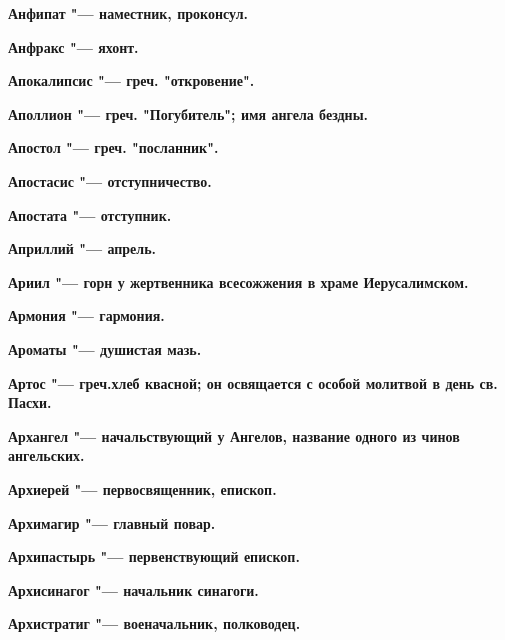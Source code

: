 \bfseries Анфипат \normalfont{} "--- наместник, проконсул. 




\bfseries Анфракс \normalfont{} "--- яхонт. 




\bfseries Апокалипсис \normalfont{} "--- греч. "откровение". 




\bfseries Аполлион \normalfont{} "--- греч. "Погубитель"; имя ангела бездны. 




\bfseries Апостол \normalfont{} "--- греч. "посланник". 




\bfseries Апостасис \normalfont{} "--- отступничество. 




\bfseries Апостата \normalfont{} "--- отступник. 




\bfseries Априллий \normalfont{} "--- апрель. 




\bfseries Ариил \normalfont{} "--- горн у жертвенника всесожжения в храме Иерусалимском. 




\bfseries Армония \normalfont{} "--- гармония. 




\bfseries Ароматы \normalfont{} "--- душистая мазь. 




\bfseries Артос \normalfont{} "--- греч.хлеб квасной; он освящается с особой молитвой в день св. Пасхи. 




\bfseries Архангел \normalfont{} "--- начальствующий у Ангелов, название одного из чинов ангельских. 




\bfseries Архиерей \normalfont{} "--- первосвященник, епископ. 




\bfseries Архимагир \normalfont{} "--- главный повар. 




\bfseries Архипастырь \normalfont{} "--- первенствующий епископ. 




\bfseries Архисинагог \normalfont{} "--- начальник синагоги. 




\bfseries Архистратиг \normalfont{} "--- военачальник, полководец. 




